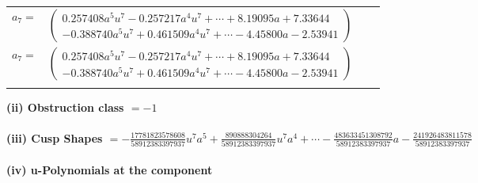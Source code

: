 \documentclass[1p]{elsarticle_modified}
\theoremstyle{definition}
\begin{document}
\begin{tabular}{m{7pt} m{180pt} m{7pt} m{180pt} }
\flushright $a_{7}=$&$\begin{pmatrix}0.257408 a^{5} u^{7}-0.257217 a^{4} u^{7}+\cdots+8.19095 a+7.33644\\-0.388740 a^{5} u^{7}+0.461509 a^{4} u^{7}+\cdots-4.45800 a-2.53941\end{pmatrix}$\\ \flushright $a_{7}=$&$\begin{pmatrix}0.257408 a^{5} u^{7}-0.257217 a^{4} u^{7}+\cdots+8.19095 a+7.33644\\-0.388740 a^{5} u^{7}+0.461509 a^{4} u^{7}+\cdots-4.45800 a-2.53941\end{pmatrix}$\\&\end{tabular}
\flushleft \textbf{(ii) Obstruction class $= -1$}\\~\\
\flushleft \textbf{(iii) Cusp Shapes $= -\frac{17781823578608}{58912383397937} u^7 a^5+\frac{890888304264}{58912383397937} u^7 a^4+\cdots-\frac{483633451308792}{58912383397937} a-\frac{241926483811578}{58912383397937}$}\\~\\
\newpage\renewcommand{\arraystretch}{1}
\flushleft \textbf{(iv) u-Polynomials at the component}\newline \\
\end{document}
